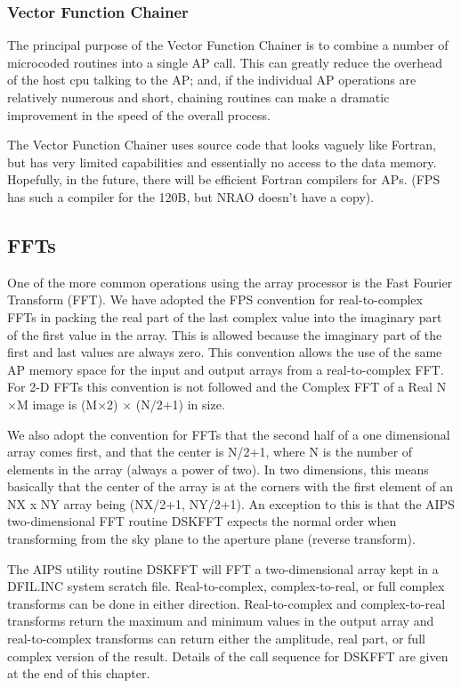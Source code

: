 \subsubsection{Vector Function Chainer }
The principal purpose of the Vector Function Chainer is to combine a
number of microcoded routines into a single AP call.  This can greatly
reduce the overhead of the host cpu talking to the AP; and, if the
individual AP operations are relatively numerous and short, chaining
routines can make a dramatic improvement in the speed of the overall
process.

The Vector Function Chainer uses source code that looks vaguely like
Fortran, but has very limited capabilities and essentially no access
to the data memory.  Hopefully, in the future, there will be efficient
Fortran compilers for APs.  (FPS has such a compiler for the 120B, but
NRAO doesn't have a copy).

\subsection{FFTs }
One of the more common operations using the array processor is the
Fast Fourier Transform (FFT).  We have adopted the FPS convention for
real-to-complex FFTs in packing the real part of the last complex
value into the imaginary part of the first value in the array. This is
allowed because the imaginary part of the first and last values are
always zero.  This convention allows the use of the same AP memory
space for the input and output arrays from a real-to-complex FFT.  For
2-D FFTs this convention is not followed and the Complex FFT of a Real
N$\times$M image is (M$\times$2) $\times$ (N/2+1) in size.

We also adopt the convention for FFTs that the second half of a one
dimensional array comes first, and that the center is N/2+1, where N
is the number of elements in the array (always a power of two).  In
two dimensions, this means basically that the center of the array is
at the corners with the first element of an NX x NY array being
(NX/2+1, NY/2+1).  An exception to this is that the AIPS
two-dimensional FFT routine DSKFFT expects the normal order when
transforming from the sky plane to the aperture plane (reverse
transform).

The AIPS utility routine DSKFFT will FFT a two-dimensional array kept
in a DFIL.INC system scratch file. Real-to-complex, complex-to-real,
or full complex transforms can be done in either direction.
Real-to-complex and complex-to-real transforms return the maximum and
minimum values in the output array and real-to-complex transforms can
return either the amplitude, real part, or full complex version of the
result.  Details of the call sequence for DSKFFT are given at the end
of this chapter.


